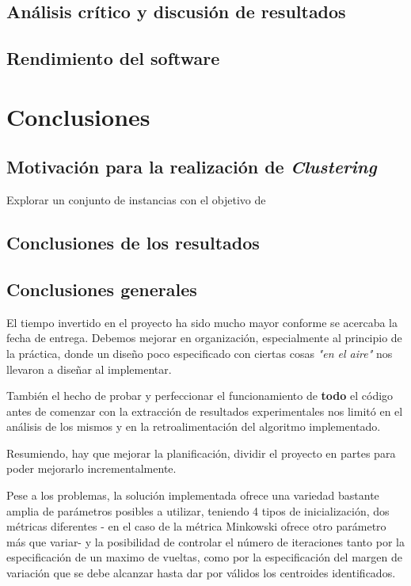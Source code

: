 \documentclass[a4paper]{report}
\begin{document}
	\section{Análisis crítico y discusión de resultados}
	
	\section{Rendimiento del software}

\chapter{Conclusiones}

	\section{Motivación para la realización de \textit{Clustering}}
	
	Explorar un conjunto de instancias con el objetivo de 
	
	\section{Conclusiones de los resultados}
	
	\section{Conclusiones generales}
	
	El tiempo invertido en el proyecto ha sido mucho mayor conforme se acercaba la fecha de entrega. Debemos mejorar en organización, especialmente al principio de la práctica, donde un diseño poco especificado con ciertas cosas \textit{"en el aire"} nos llevaron a diseñar al implementar.
	
	También el hecho de probar y perfeccionar el funcionamiento de \textbf{todo} el código antes de comenzar con la extracción de resultados experimentales nos limitó en el análisis de los mismos y en la retroalimentación del algoritmo implementado.
	
	Resumiendo, hay que mejorar la planificación, dividir el proyecto en partes para poder mejorarlo incrementalmente.
	
	Pese a los problemas, la solución implementada ofrece una variedad bastante amplia de parámetros posibles a utilizar, teniendo 4 tipos de inicialización, dos métricas diferentes - en el caso de la métrica Minkowski ofrece otro parámetro más que variar- y la posibilidad de controlar el número de iteraciones tanto por la especificación de un maximo de vueltas, como por la especificación del margen de variación que se debe alcanzar hasta dar por válidos los centroides identificados.
	
\end{document}
